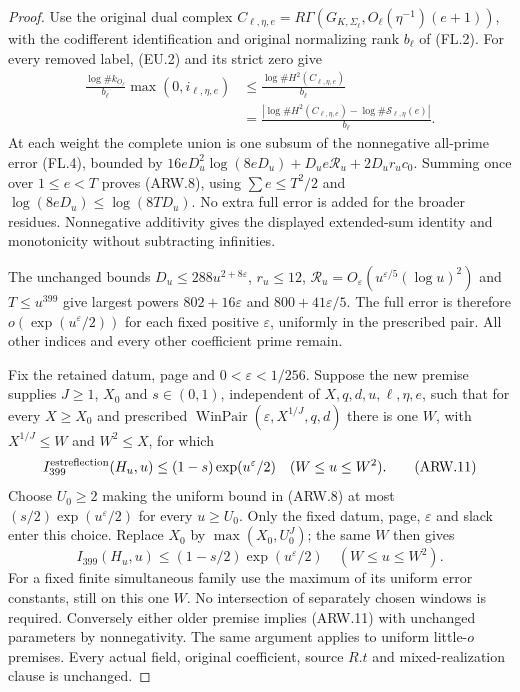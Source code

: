 \begin{proof}
Use the original dual complex
$C_{\ell,\eta,e}=R\Gamma(G_{K,\Sigma_\ell},
O_\ell(\eta^{-1})(e+1))$, with the codifferent identification
and original normalizing rank $b_\ell$ of (FL.2).
For every removed label, (EU.2) and its strict zero give
\[
 \begin{aligned}
 \frac{\log\#k_{O_\ell}}{b_\ell}\max(0,i_{\ell,\eta,e})
 &\leq\frac{\log\#H^2(C_{\ell,\eta,e})}{b_\ell}\\
 &=\frac{\left|\log\#H^2(C_{\ell,\eta,e})
                   -\log\#\mathcal S_{\ell,\eta}(e)\right|}{b_\ell}.
 \end{aligned}
 \tag{ARW.10}
\]
At each weight the complete union is one subsum of the
nonnegative all-prime error (FL.4), bounded by
$16eD_u^2\log(8eD_u)+D_ue\mathcal R_u+2D_ur_uc_0$.
Summing once over $1\leq e<T$ proves (ARW.8), using
$\sum e\leq T^2/2$ and $\log(8eD_u)\leq\log(8TD_u)$.
No extra full error is added for the broader residues.
Nonnegative additivity gives the displayed extended-sum identity
and monotonicity without subtracting infinities.

The unchanged bounds $D_u\leq288u^{2+8\varepsilon}$,
$r_u\leq12$, $\mathcal R_u=O_\varepsilon(u^{\varepsilon/5}(\log u)^2)$
and $T\leq u^{399}$ give largest powers
$802+16\varepsilon$ and $800+41\varepsilon/5$.
The full error is therefore $o(\exp(u^\varepsilon/2))$ for each
fixed positive $\varepsilon$, uniformly in the prescribed pair.
All other indices and every other coefficient prime remain.

Fix the retained datum, page and $0<\varepsilon<1/256$.
Suppose the new premise supplies $J\geq1$, $X_0$ and
$s\in(0,1)$, independent of $X,q,d,u,\ell,\eta,e$, such that
for every $X\geq X_0$ and prescribed
$\operatorname{WinPair}(\varepsilon,X^{1/J},q,d)$ there is
one $W$, with $X^{1/J}\leq W$ and $W^2\leq X$, for which
\[
 I_{399}^{\rm estreflection}(H_u,u)\leq(1-s)\exp(u^\varepsilon/2)
                                  \quad(W\leq u\leq W^2).
 \tag{ARW.11}
\]
Choose $U_0\geq2$ making the uniform bound in (ARW.8) at most
$(s/2)\exp(u^\varepsilon/2)$ for every $u\geq U_0$.
Only the fixed datum, page, $\varepsilon$ and slack enter this choice.
Replace $X_0$ by $\max(X_0,U_0^J)$; the same $W$ then gives
\[
 I_{399}(H_u,u)\leq(1-s/2)\exp(u^\varepsilon/2)
                                  \quad(W\leq u\leq W^2).
 \tag{ARW.12}
\]
For a fixed finite simultaneous family use the maximum of its
uniform error constants, still on this one $W$.
No intersection of separately chosen windows is required.
Conversely either older premise implies (ARW.11) with unchanged
parameters by nonnegativity.  The same argument applies to
uniform little-$o$ premises.  Every actual field, original
coefficient, source $R.t$ and mixed-realization clause is unchanged.
\end{proof}


